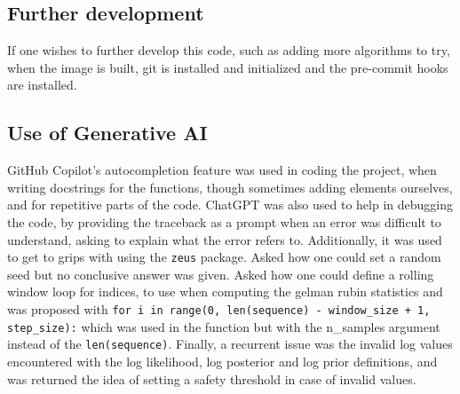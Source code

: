 \documentclass[12pt]{report} %
\begin{document}
\subsection{Further development}

If one wishes to further develop this code, such as adding more algorithms to try, when the image is built, git is installed and initialized and the pre-commit hooks are installed.

\subsection{Use of Generative AI}

GitHub Copilot's autocompletion feature was used in coding the project, when writing docstrings for the functions, though sometimes adding elements ourselves, and for repetitive parts of the code.
ChatGPT was also used to help in debugging the code, by providing the traceback as a prompt when an error was difficult to understand, asking to explain what the error refers to. Additionally, it was used to get to grips with using the \texttt{zeus} package. Asked how one could set a random seed but no conclusive answer was given. Asked how one could define a rolling window loop for indices, to use when computing the gelman rubin statistics and was proposed with \texttt{for i in range(0, len(sequence) - window\_size + 1, step\_size):} which was used in the function but with the n\_samples argument instead of the \texttt{len(sequence)}. Finally, a recurrent issue was the invalid log values encountered with the log likelihood, log posterior and log prior definitions, and was returned the idea of setting a safety threshold in case of invalid values.




\end{document}
